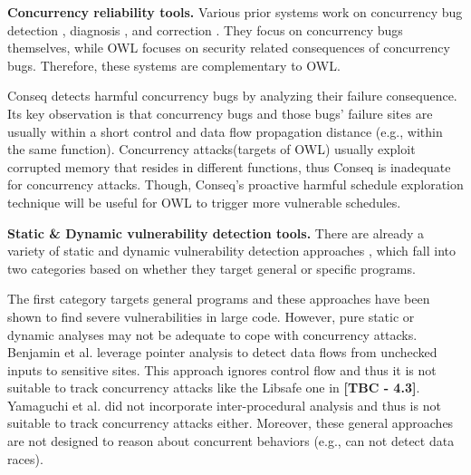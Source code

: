 \noindent
\textbf{Concurrency reliability tools.} Various prior systems work
on concurrency bug detection \cite{yu:racetrack:sosp,savage:eraser,racerx:sosp03,lu:muvi:sosp,avio:asplos06,conmem:asplos10,conseq:asplos11,kasikci2013racemob,wester:parallelizing:asplos13,kasikci2015techniques}, diagnosis \cite{racefuzzer:pldi08,ctrigger:asplos09,kasikci2015techniques,atomfuzzer:fse08,attariyan2012x,failure:sketch:sosp15}, and correction \cite{deadlock-immunity:osdi08,gadara:osdi08,wu:loom:osdi10,automated:osdi}. They focus on concurrency bugs themselves, while
OWL focuses on security related consequences of concurrency
bugs. Therefore, these systems are complementary to OWL.

Conseq \cite{conseq:asplos11} detects harmful concurrency bugs by analyzing
their failure consequence. Its key observation is that concurrency
bugs and those bugs' failure sites are usually within a
short control and data flow propagation distance (e.g., within
the same function). Concurrency attacks(targets of OWL)
usually exploit corrupted memory that resides in different
functions, thus Conseq is inadequate for concurrency attacks.
Though, Conseq’s proactive harmful schedule exploration technique
will be useful for OWL to trigger more vulnerable schedules.

\noindent
\textbf{Static \& Dynamic vulnerability detection tools.} There are already a variety
of static and dynamic vulnerability detection approaches \cite{livshits05finding,yamaguchi2014modeling,felmetsger2010toward,felmetsger2010toward,srivastava2011security,zhang:usenix:sec02, paleari2008race}, which fall into two categories based
on whether they target general or specific programs.

The first category \cite{livshits05finding,yamaguchi2014modeling} targets general programs and
these approaches have been shown to find severe vulnerabilities
in large code. However, pure static or dynamic analyses may
not be adequate to cope with concurrency attacks. Benjamin
et al. \cite{livshits05finding} leverage pointer analysis to detect data flows from
unchecked inputs to sensitive sites. This approach ignores
control flow and thus it is not suitable to track concurrency
attacks like the Libsafe one in \textbf{[TBC - 4.3]}. Yamaguchi et al. \cite{yamaguchi2014modeling}
did not incorporate inter-procedural analysis and thus is not
suitable to track concurrency attacks either. Moreover, these
general approaches are not designed to reason about concurrent
behaviors (e.g., \cite{yamaguchi2014modeling} can not detect data races).

